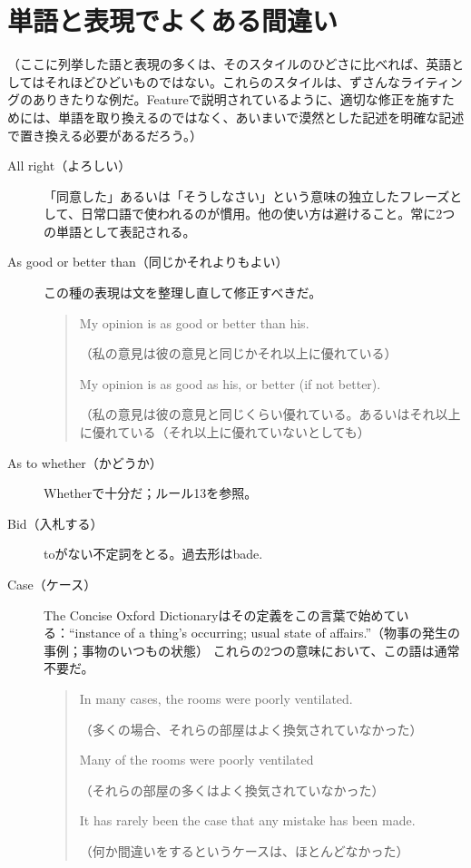 \chapter{単語と表現でよくある間違い}
（ここに列挙した語と表現の多くは、そのスタイルのひどさに比べれば、英語としてはそれほどひどいものではない。これらのスタイルは、ずさんなライティングのありきたりな例だ。Featureで説明されているように、適切な修正を施すためには、単語を取り換えるのではなく、あいまいで漠然とした記述を明確な記述で置き換える必要があるだろう。）
\begin{description}
\item [All right（よろしい）]
「同意した」あるいは「そうしなさい」という意味の独立したフレーズとして、日常口語で使われるのが慣用。他の使い方は避けること。常に2つの単語として表記される。
\item[As good or better than（同じかそれよりもよい）]
この種の表現は文を整理し直して修正すべきだ。
\begin{quote}
    My opinion is as good or better than his.
    
    （私の意見は彼の意見と同じかそれ以上に優れている）
    
    My opinion is as good as his, or better (if not better).
    
    （私の意見は彼の意見と同じくらい優れている。あるいはそれ以上に優れている（それ以上に優れていないとしても）
\end{quote}
\item [ As to whether（かどうか）]Whetherで十分だ；ルール13を参照。
\item[Bid（入札する）]toがない不定詞をとる。過去形はbade.
\item [Case（ケース）] The Concise Oxford
Dictionaryはその定義をこの言葉で始めている：``instance of a thing's
occurring; usual state of
affairs.''（物事の発生の事例；事物のいつもの状態）
これらの2つの意味において、この語は通常不要だ。
\begin{quote}
    In many cases, the rooms were poorly ventilated.
    
    （多くの場合、それらの部屋はよく換気されていなかった）
    
    Many of the rooms were poorly ventilated
    
    （それらの部屋の多くはよく換気されていなかった）
    
    It has rarely been the case that any mistake has been made.
    
    （何か間違いをするというケースは、ほとんどなかった）
    

\end{quote}
\end{description}
